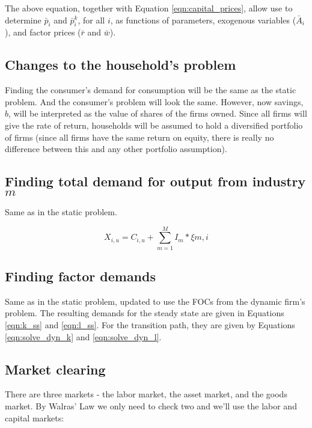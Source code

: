 \documentclass[letterpaper,12pt]{article}
\theoremstyle{definition}
\begin{document}
\begin{spacing}{1.5}
The above equation, together with Equation \ref{eqn:capital_prices}, allow use to determine $\bar{p}_{i}$ and $\bar{p}^{k}_{i}$, for all $i$, as functions of parameters, exogenous variables ($\bar{A}_{i}$), and factor prices ($\bar{r}$ and $\bar{w}$).


\subsection*{Changes to the household's problem}

Finding the consumer's demand for consumption will be the same as the static problem.  And the consumer's problem will look the same.  However, now savings, $b$, will be interpreted as the value of shares of the firms owned.  Since all firms will give the rate of return, households will be assumed to hold a diversified portfolio of firms (since all firms have the same return on equity, there is really no difference between this and any other portfolio assumption).  

\subsection*{Finding total demand for output from industry $m$}

Same as in the static problem.

\begin{equation}
\label{eqn:output_demand_dyn}
X_{i,u} = C_{i,u} + \sum_{m=1}^{M}I_{m}*\xi{m,i}
\end{equation}

\subsection*{Finding factor demands}

Same as in the static problem, updated to use the FOCs from the dynamic firm's problem.  The resulting demands for the steady state are given in Equations \ref{eqn:k_ss} and \ref{eqn:l_ss}.  For the transition path, they are given by Equations \ref{eqn:solve_dyn_k} and \ref{eqn:solve_dyn_l}.


\subsection*{Market clearing}

There are three markets - the labor market, the asset market, and the goods market.  By Walras' Law we only need to check two and we'll use the labor and capital markets:


\end{spacing}
\end{document}
